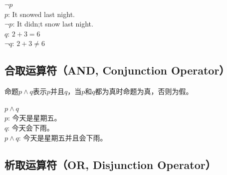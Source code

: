 \documentclass[12pt, openany, oneside]{book}
\begin{document}
\begin{tcolorbox}
    $ \neg p $ \\
    $ p $: It snowed last night. \\
    $ \neg p $: It didn;t snow last night. \\
    $ q $: $ 2 + 3 = 6 $ \\
    $ \neg q $: $ 2 + 3 \ne 6 $
\end{tcolorbox}

\subsection{合取运算符（AND, Conjunction Operator）}

命题$ p \wedge q $表示$ p $并且$ q $，当$ p $和$ q $都为真时命题为真，否则为假。

\begin{table}[H]
    \centering
    \caption{AND真值表}
\end{table}

\begin{tcolorbox}
    $ p \wedge q $ \\
    $ p $: 今天是星期五。 \\
    $ q $: 今天会下雨。 \\
    $ p \wedge q $: 今天是星期五并且会下雨。
\end{tcolorbox}

\subsection{析取运算符（OR, Disjunction Operator）}
\end{document}
